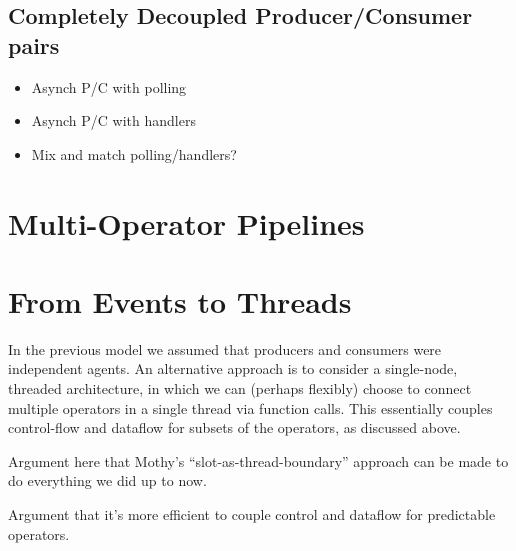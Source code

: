 \documentclass[dvips,10pt]{article}
\begin{document}
\subsection{Completely Decoupled Producer/Consumer pairs}
\begin{itemize}
\item Asynch P/C with polling 
\item Asynch P/C with handlers
\item Mix and match polling/handlers?
\end{itemize}

\section{Multi-Operator Pipelines}

\section{From Events to Threads}
In the previous model we assumed that producers and consumers were
independent agents.  An alternative approach is to consider a
single-node, threaded architecture, in which we can (perhaps flexibly)
choose to connect multiple operators in a single thread via function
calls.  This essentially couples control-flow and dataflow for subsets
of the operators, as discussed above.

Argument here that Mothy's ``slot-as-thread-boundary'' approach can be
made to do everything we did up to now.  

Argument that it's more efficient to couple control and dataflow for
predictable operators.
\end{document}
